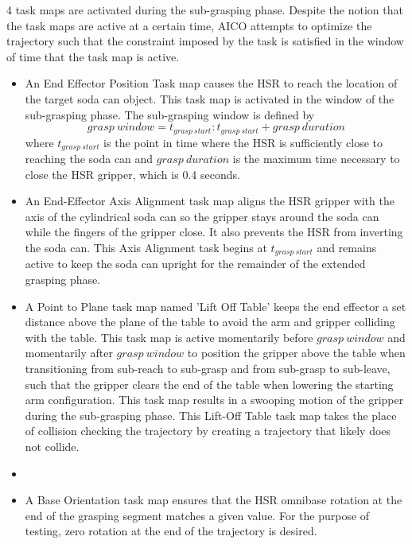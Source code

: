 \documentclass[11pt]{article}
\begin{document}
                4 task maps are activated during the sub-grasping phase. Despite the notion that the task maps are active at a certain time, AICO attempts to optimize the trajectory such that the constraint imposed by the task is satisfied in the window of time that the task map is active.
                \begin{itemize}
                    \item An End Effector Position Task map causes the HSR to reach the location of the target soda can object. This task map is activated in the window of the sub-grasping phase. The sub-grasping window is defined by 
                    \[{grasp\ window} = t_{grasp\ start}: t_{grasp\ start}+grasp\  duration\] 
                    where \(t_{grasp\ start}\) is the point in time where the HSR is sufficiently close to reaching the soda can and \({grasp\ duration}\) is the maximum time necessary to close the HSR gripper, which is 0.4 seconds.

                    \item An End-Effector Axis Alignment task map aligns the HSR gripper with the axis of the cylindrical soda can so the gripper stays around the soda can while the fingers of the gripper close. It also prevents the HSR from inverting the soda can. This Axis Alignment task begins at \(t_{grasp\ start}\) and remains active to keep the soda can upright for the remainder of the extended grasping phase.

                    \item A Point to Plane task map named 'Lift Off Table' keeps the end effector a set distance above the plane of the table to avoid the arm and gripper colliding with the table. This task map is active momentarily before \({grasp\ window}\) and momentarily after \({grasp\ window}\) to position the gripper above the table when transitioning from sub-reach to sub-grasp and from sub-grasp to sub-leave, such that the gripper clears the end of the table when lowering the starting arm configuration. This task map results in a swooping motion of the gripper during the sub-grasping phase. This Lift-Off Table task map takes the place of collision checking the trajectory by creating a trajectory that likely does not collide.
                    \item 
                    \item A Base Orientation task map ensures that the HSR omnibase rotation at the end of the grasping segment matches a given value. For the purpose of testing, zero rotation at the end of the trajectory is desired.
                \end{itemize}
\end{document}
